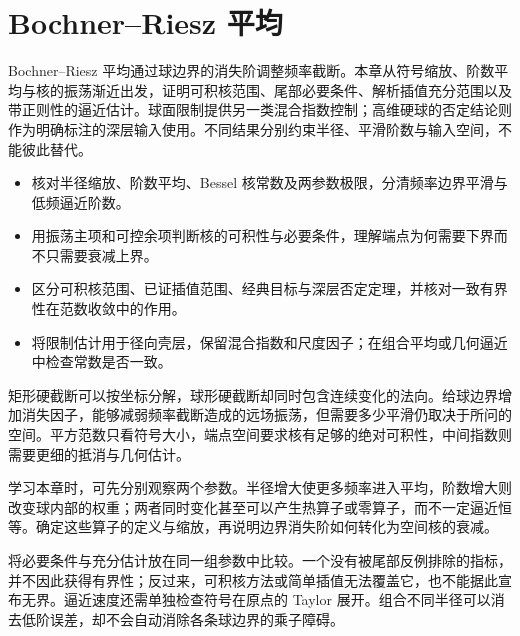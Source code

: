\chapter{Bochner–Riesz 平均}
\label{b2:ch:24}
\begin{chapterabstract}
Bochner--Riesz 平均通过球边界的消失阶调整频率截断。本章从符号缩放、阶数平均与核的振荡渐近出发，证明可积核范围、尾部必要条件、解析插值充分范围以及带正则性的逼近估计。球面限制提供另一类混合指数控制；高维硬球的否定结论则作为明确标注的深层输入使用。不同结果分别约束半径、平滑阶数与输入空间，不能彼此替代。
\end{chapterabstract}

\begin{learninggoals}\begin{itemize}
\item\label{b2:item:24-goal-1}核对半径缩放、阶数平均、Bessel 核常数及两参数极限，分清频率边界平滑与低频逼近阶数。
\item\label{b2:item:24-goal-2}用振荡主项和可控余项判断核的可积性与必要条件，理解端点为何需要下界而不只需要衰减上界。
\item\label{b2:item:24-goal-3}区分可积核范围、已证插值范围、经典目标与深层否定定理，并核对一致有界性在范数收敛中的作用。
\item\label{b2:item:24-goal-4}将限制估计用于径向壳层，保留混合指数和尺度因子；在组合平均或几何逼近中检查常数是否一致。
\end{itemize}\end{learninggoals}

矩形硬截断可以按坐标分解，球形硬截断却同时包含连续变化的法向。给球边界增加消失因子，能够减弱频率截断造成的远场振荡，但需要多少平滑仍取决于所问的空间。平方范数只看符号大小，端点空间要求核有足够的绝对可积性，中间指数则需要更细的抵消与几何估计。

\ProseParagraphBreak

学习本章时，可先分别观察两个参数。半径增大使更多频率进入平均，阶数增大则改变球内部的权重；两者同时变化甚至可以产生热算子或零算子，而不一定逼近恒等。确定这些算子的定义与缩放，再说明边界消失阶如何转化为空间核的衰减。

\ProseParagraphBreak

将必要条件与充分估计放在同一组参数中比较。一个没有被尾部反例排除的指标，并不因此获得有界性；反过来，可积核方法或简单插值无法覆盖它，也不能据此宣布无界。逼近速度还需单独检查符号在原点的 Taylor 展开。组合不同半径可以消去低阶误差，却不会自动消除各条球边界的乘子障碍。


